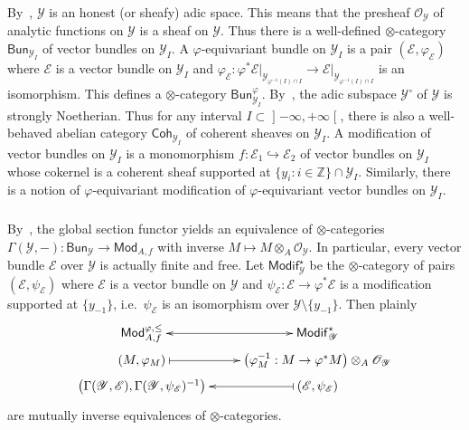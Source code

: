 \documentclass[11pt]{article}
\theoremstyle{definition}
\numberwithin{equation}{section}
\numberwithin{figure}{section}
\numberwithin{table}{section}
\newcommand{\Coh}{\mathsf{Coh}}
\newcommand{\Mod}{\mathsf{Mod}}
\newcommand{\Modif}{\mathsf{Modif}}
\newcommand{\Bun}{\mathsf{Bun}}
\begin{document}
\subsubsection{}

By~\cite[13.1.1]{ScWe15}, $\mathscr{Y}$ is an honest (or sheafy) adic space. This means that the presheaf $\mathscr{O}_{\mathscr{Y}}$ of analytic functions on $\mathscr{Y}$ is a sheaf on $\mathscr{Y}$. Thus there is a well-defined $\otimes$-category $\Bun_{\mathscr{Y}_{I}}$ of vector bundles on $\mathscr{Y}_{I}$. A $\varphi$-equivariant bundle on $\mathscr{Y}_{I}$ is a pair $(\mathscr{E},\varphi_{\mathscr{E}})$ where $\mathscr{E}$ is a vector bundle on $\mathscr{Y}_{I}$ and $\varphi_{\mathscr{E}}:\varphi^{\ast}\mathscr{E}\vert_{\mathscr{Y}_{\varphi^{-1}(I)\cap I}}\rightarrow\mathscr{E}\vert_{\mathscr{Y}_{\varphi^{-1}(I)\cap I}}$ is an isomorphism. This defines a $\otimes$-category $\Bun_{\mathscr{Y}_{I}}^{\varphi}$. By~\cite{Ke16}, the adic subspace $\mathscr{Y}^{\circ}$ of $\mathscr{Y}$ is strongly Noetherian. Thus for any interval $I\subset\mathopen]-\infty,+\infty\mathclose[$, there is also a well-behaved abelian category $\Coh_{\mathscr{Y}_{I}}$ of coherent sheaves on $\mathscr{Y}_{I}$. A modification of vector bundles on $\mathscr{Y}_{I}$ is a monomorphism $f:\mathscr{E}_{1}\hookrightarrow\mathscr{E}_{2}$ of vector bundles on $\mathscr{Y}_{I}$ whose cokernel is a coherent sheaf supported at $\{y_{i}:i\in\mathbb{Z}\}\cap\mathscr{Y}_{I}$. Similarly, there is a notion of $\varphi$-equivariant modification of $\varphi$-equivariant vector bundles on $\mathscr{Y}_{I}$.

\subsubsection{}\label{subsec:FromBKF2Modif*}

By~\cite[3.9]{Ke16b}, the global section functor yields an equivalence of $\otimes$-categories $\Gamma(\mathscr{Y},-):\Bun_{\mathscr{Y}}\rightarrow\Mod_{A,f}$ with inverse $M\mapsto M\otimes_{A}\mathscr{O}_{\mathscr{Y}}$. In particular, every vector bundle $\mathscr{E}$ over $\mathscr{Y}$ is actually finite and free. Let $\Modif_{\mathscr{Y}}^{\star}$ be the $\otimes$-category of pairs $(\mathscr{E},\psi_{\mathscr{E}})$ where $\mathscr{E}$ is a vector bundle on $\mathscr{Y}$ and $\psi_{\mathscr{E}}:\mathscr{E}\rightarrow\varphi^{\ast}\mathscr{E}$ is a modification supported at $\{y_{-1}\}$, i.e.~$\psi_{\mathscr{E}}$ is an isomorphism over $\mathscr{Y}\setminus\{y_{-1}\}$. Then plainly
\[
\xymatrix@C=2pc@R=0.2pc{\Mod_{A,f}^{\varphi,\leq}\ar@{<->}[r] & \Modif_{\mathscr{Y}}^{\star}\\
(M,\varphi_{M})\ar@{|->}[r] & \left(\varphi_{M}^{-1}:M\rightarrow\varphi^{\ast}M\right)\otimes_{A}\mathscr{O}_{\mathscr{Y}}\\
\left(\Gamma(\mathscr{Y},\mathscr{E}),\Gamma(\mathscr{Y},\psi_{\mathscr{E}})^{-1}\right) & (\mathscr{E},\psi_{\mathscr{E}})\ar@{|->}[l] }
\]
are mutually inverse equivalences of $\otimes$-categories.
\end{document}
